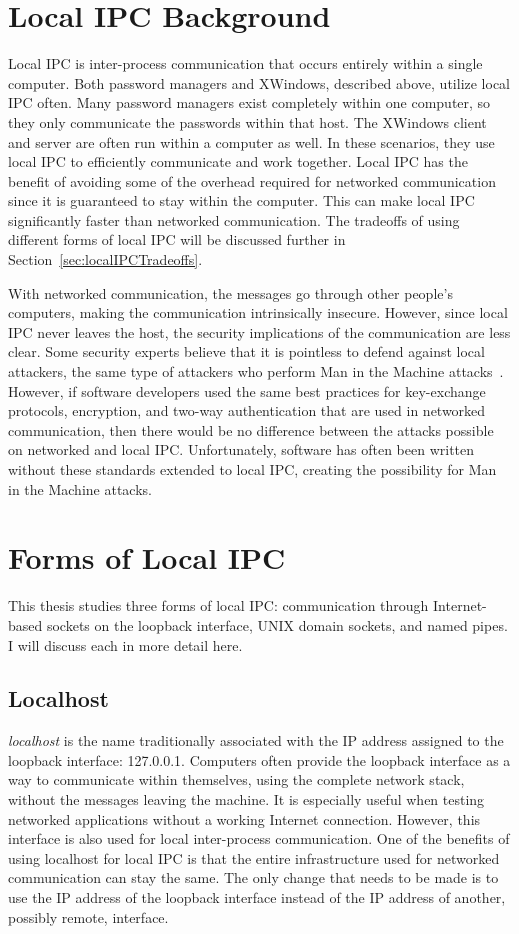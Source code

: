\section{Local IPC Background}
\label{sec:localIPCBackground}
Local IPC is inter-process communication that occurs entirely within a single computer.  Both password managers and XWindows, described above, utilize local IPC often.  Many password managers exist completely within one computer, so they only communicate the passwords within that host.  The XWindows client and server are often run within a computer as well.  In these scenarios, they use local IPC to efficiently communicate and work together.  Local IPC has the benefit of avoiding some of the overhead required for networked communication since it is guaranteed to stay within the computer.  This can make local IPC significantly faster than networked communication.  The tradeoffs of using different forms of local IPC will be discussed further in Section~\ref{sec:localIPCTradeoffs}.

With networked communication, the messages go through other people's computers, making the communication intrinsically insecure.  However, since local IPC never leaves the host, the security implications of the communication are less clear.  Some security experts believe that it is pointless to defend against local attackers, the same type of attackers who perform Man in the Machine attacks~\cite{MitMa}.  However, if software developers used the same best practices for key-exchange protocols, encryption, and two-way authentication that are used in networked communication, then there would be no difference between the attacks possible on networked and local IPC.  Unfortunately, software has often been written without these standards extended to local IPC, creating the possibility for Man in the Machine attacks.

\section{Forms of Local IPC}
\label{sec:formsOfLocalIPC}
This thesis studies three forms of local IPC: communication through Internet-based sockets on the loopback interface, UNIX domain sockets, and named pipes.  I will discuss each in more detail here.

\subsection{Localhost}
\label{sec:localhost}
\textit{localhost} is the name traditionally associated with the IP address assigned to the loopback interface: 127.0.0.1.  Computers often provide the loopback interface as a way to communicate within themselves, using the complete network stack, without the messages leaving the machine.  It is especially useful when testing networked applications without a working Internet connection.  However, this interface is also used for local inter-process communication.  One of the benefits of using localhost for local IPC is that the entire infrastructure used for networked communication can stay the same.  The only change that needs to be made is to use the IP address of the loopback interface instead of the IP address of another, possibly remote, interface.

